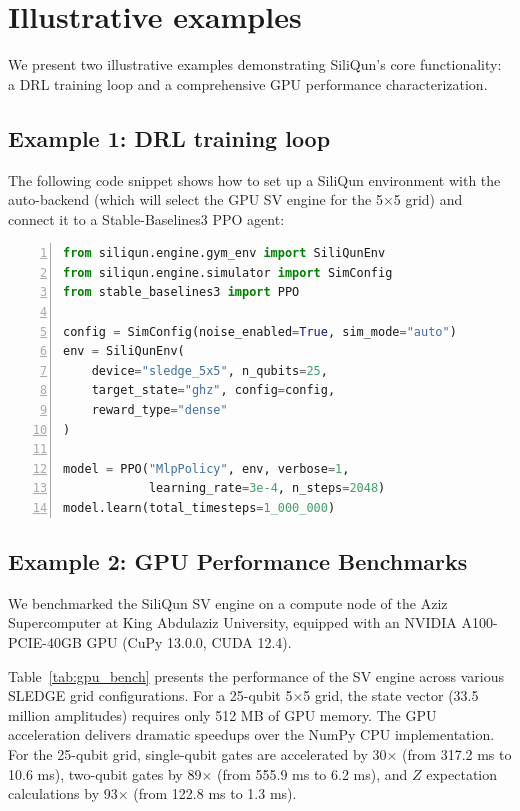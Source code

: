 \documentclass[preprint,12pt, a4paper]{elsarticle}
\begin{document}
\section{Illustrative examples}
\label{sec:examples}

We present two illustrative examples demonstrating SiliQun's core functionality: a DRL training loop and a comprehensive GPU performance characterization.

\subsection{Example 1: DRL training loop}

The following code snippet shows how to set up a SiliQun environment with the auto-backend (which will select the GPU SV engine for the 5$\times$5 grid) and connect it to a Stable-Baselines3 PPO agent:

\begin{lstlisting}[language=Python, basicstyle=\footnotesize\ttfamily, backgroundcolor=\color{gray!10}, frame=single, numbers=left, numberstyle=\tiny\color{gray}]
from siliqun.engine.gym_env import SiliQunEnv
from siliqun.engine.simulator import SimConfig
from stable_baselines3 import PPO

config = SimConfig(noise_enabled=True, sim_mode="auto")
env = SiliQunEnv(
    device="sledge_5x5", n_qubits=25,
    target_state="ghz", config=config,
    reward_type="dense"
)

model = PPO("MlpPolicy", env, verbose=1,
            learning_rate=3e-4, n_steps=2048)
model.learn(total_timesteps=1_000_000)
\end{lstlisting}

\subsection{Example 2: GPU Performance Benchmarks}

We benchmarked the SiliQun SV engine on a compute node of the Aziz Supercomputer at King Abdulaziz University, equipped with an NVIDIA A100-PCIE-40GB GPU (CuPy 13.0.0, CUDA 12.4).

Table~\ref{tab:gpu_bench} presents the performance of the SV engine across various SLEDGE grid configurations. For a 25-qubit 5$\times$5 grid, the state vector (33.5 million amplitudes) requires only 512 MB of GPU memory. The GPU acceleration delivers dramatic speedups over the NumPy CPU implementation. For the 25-qubit grid, single-qubit gates are accelerated by 30$\times$ (from 317.2 ms to 10.6 ms), two-qubit gates by 89$\times$ (from 555.9 ms to 6.2 ms), and $Z$ expectation calculations by 93$\times$ (from 122.8 ms to 1.3 ms). 
\end{document}
